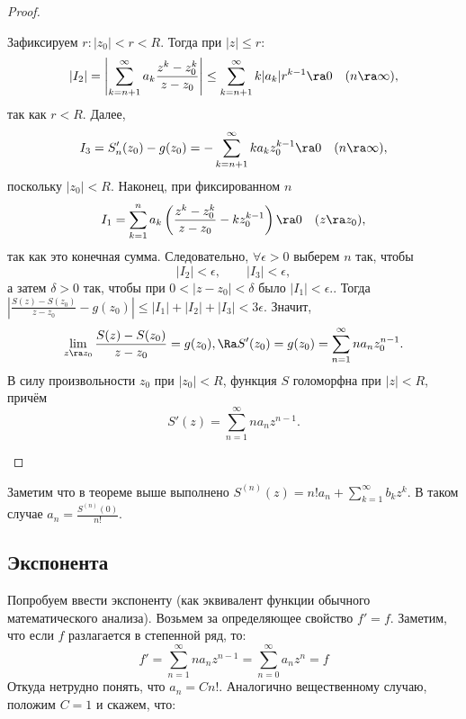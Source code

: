 \begin{proof}
\begin{enumerate}
        Зафиксируем \(r: |z_0| < r < R\). Тогда при \(|z| \le r\):
        \[
        |I_2|
        =
        \left|
        \sum_{k=n+1}^\infty a_k \frac{z^k-z_0^k}{z-z_0}
        \right|
        \le
        \sum_{k=n+1}^\infty k|a_k|r^{k-1}
        \ra 0 \quad (n \ra \infty),
        \]
        так как \(r < R\). Далее,
        \[
        I_3
        =
        S_n'(z_0)-g(z_0)
        =
        -\sum_{k=n+1}^\infty k a_k z_0^{k-1}
        \ra 0 \quad (n \ra \infty),
        \]
        поскольку \(|z_0| < R\). Наконец, при фиксированном \(n\)
        \[
        I_1
        =
        \sum_{k=1}^n a_k\left(\frac{z^k-z_0^k}{z-z_0}-kz_0^{k-1}\right)
        \ra 0 \quad (z \ra z_0),
        \]
        так как это конечная сумма. Следовательно, \(\forall \epsilon > 0\) выберем \(n\) так, чтобы
        \[
        |I_2| < \epsilon,\qquad |I_3| < \epsilon,
        \]
        а затем \(\delta > 0\) так, чтобы при \(0 < |z-z_0| < \delta\) было
        \(
        |I_1| < \epsilon.
        \). Тогда
        \(
        \left|
        \frac{S(z)-S(z_0)}{z-z_0}-g(z_0)
        \right|
        \le |I_1|+|I_2|+|I_3|
        < 3\epsilon
        \). Значит,
        \[
        \lim_{z \ra z_0}\frac{S(z)-S(z_0)}{z-z_0}=g(z_0),
        \Ra
        S'(z_0)=g(z_0)=\sum_{n=1}^\infty n a_n z_0^{n-1}.
        \]
        В силу произвольности \(z_0\) при \(|z_0|<R\), функция \(S\) голоморфна при \(|z|<R\), причём
        \[
        S'(z)=\sum_{n=1}^\infty n a_n z^{n-1}.
        \]
    \end{enumerate}
\end{proof}

\begin{note}
    Заметим что в теореме выше выполнено \(S^{(n)}(z) = n!a_n + \sum_{k = 1}^\infty b_kz^k\). В таком случае \(a_n = \frac{S^{(n)}(0)}{n!}\).
\end{note}


\subsection{Экспонента}

Попробуем ввести экспоненту (как эквивалент функции обычного математического анализа). Возьмем за определяющее свойство \(f' = f\). Заметим, что если \(f\) разлагается в степенной ряд, то:
\[f' = \sum_{n = 1}^\infty na_nz^{n - 1} = \sum_{n = 0}^\infty a_nz^n = f\]
Откуда нетрудно понять, что \(a_n = Cn!\). Аналогично вещественному случаю, положим \(C = 1\) и скажем, что:

